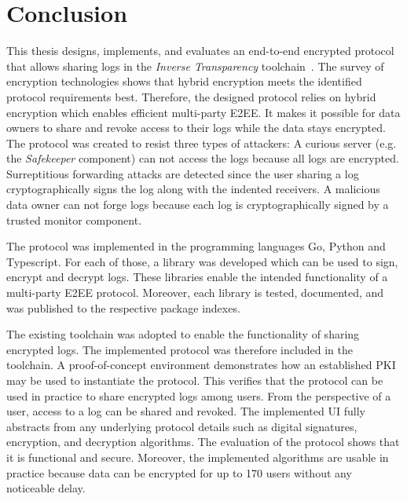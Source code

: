 \documentclass[../main.tex]{subfiles}
\begin{document}
\chapter{Conclusion}

This thesis designs, implements, and evaluates an end-to-end encrypted protocol that allows sharing logs in the \emph{Inverse Transparency} toolchain~\cite{Zieglmeier2021}.
The survey of encryption technologies shows that hybrid encryption meets the identified protocol requirements best.
Therefore, the designed protocol relies on hybrid encryption which enables efficient multi-party E2EE.
It makes it possible for data owners to share and revoke access to their logs while the data stays encrypted.
The protocol was created to resist three types of attackers: 
A curious server (e.g. the \emph{Safekeeper} component) can not access the logs because all logs are encrypted.
Surreptitious forwarding attacks are detected since the user sharing a log cryptographically signs the log along with the indented receivers.
A malicious data owner can not forge logs because each log is cryptographically signed by a trusted monitor component.

The protocol was implemented in the programming languages Go, Python and Typescript.
For each of those, a library was developed which can be used to sign, encrypt and decrypt logs.
These libraries enable the intended functionality of a multi-party E2EE protocol.
Moreover, each library is tested, documented, and was published to the respective package indexes.

The existing toolchain was adopted to enable the functionality of sharing encrypted logs.
The implemented protocol was therefore included in the toolchain.
A proof-of-concept environment demonstrates how an established PKI may be used to instantiate the protocol.
This verifies that the protocol can be used in practice to share encrypted logs among users.
From the perspective of a user, access to a log can be shared and revoked.
The implemented UI fully abstracts from any underlying protocol details such as digital signatures, encryption, and decryption algorithms.
The evaluation of the protocol shows that it is functional and secure.
Moreover, the implemented algorithms are usable in practice because data can be encrypted for up to 170 users without any noticeable delay.
\end{document}
